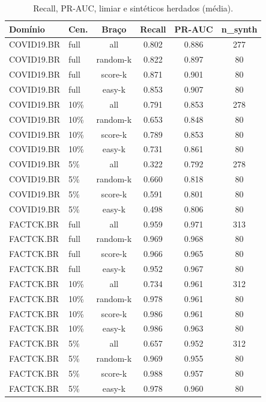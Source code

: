 \documentclass[conference]{IEEEtran}
\begin{document}
\begin{table}[t]
\caption{Recall, PR-AUC, limiar e sint\'eticos herdados (m\'edia).}\label{tab:aux}
\centering
\begin{tabular}{llcccc}
\toprule
Dom\'inio & Cen. & Bra\c{c}o & Recall & PR-AUC & n\_synth \\
\midrule
COVID19.BR & full & all & 0.802 & 0.886 & 277 \\
COVID19.BR & full & random-k & 0.822 & 0.897 & 80 \\
COVID19.BR & full & score-k & 0.871 & 0.901 & 80 \\
COVID19.BR & full & easy-k & 0.853 & 0.907 & 80 \\
COVID19.BR & 10\% & all & 0.791 & 0.853 & 278 \\
COVID19.BR & 10\% & random-k & 0.653 & 0.848 & 80 \\
COVID19.BR & 10\% & score-k & 0.789 & 0.853 & 80 \\
COVID19.BR & 10\% & easy-k & 0.731 & 0.861 & 80 \\
COVID19.BR & 5\% & all & 0.322 & 0.792 & 278 \\
COVID19.BR & 5\% & random-k & 0.660 & 0.818 & 80 \\
COVID19.BR & 5\% & score-k & 0.591 & 0.801 & 80 \\
COVID19.BR & 5\% & easy-k & 0.498 & 0.806 & 80 \\
FACTCK.BR & full & all & 0.959 & 0.971 & 313 \\
FACTCK.BR & full & random-k & 0.969 & 0.968 & 80 \\
FACTCK.BR & full & score-k & 0.966 & 0.965 & 80 \\
FACTCK.BR & full & easy-k & 0.952 & 0.967 & 80 \\
FACTCK.BR & 10\% & all & 0.734 & 0.961 & 312 \\
FACTCK.BR & 10\% & random-k & 0.978 & 0.961 & 80 \\
FACTCK.BR & 10\% & score-k & 0.986 & 0.961 & 80 \\
FACTCK.BR & 10\% & easy-k & 0.986 & 0.963 & 80 \\
FACTCK.BR & 5\% & all & 0.657 & 0.952 & 312 \\
FACTCK.BR & 5\% & random-k & 0.969 & 0.955 & 80 \\
FACTCK.BR & 5\% & score-k & 0.988 & 0.957 & 80 \\
FACTCK.BR & 5\% & easy-k & 0.978 & 0.960 & 80 \\
\bottomrule
\end{tabular}
\end{table}
\end{document}
